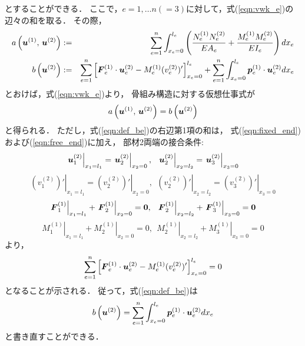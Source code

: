 \documentclass[10pt,a4j]{jarticle}
\begin{document}
とすることができる．
ここで，$e=1,\dots n(=3)$に対して，式(\ref{eqn:vwk_e})の辺々の和を取る．
その際，
\begin{eqnarray}
	a\left(
		\fat{u}^{(1)}
		,\,  
		\fat{u}^{(2)}
	\right) 
	&:=& 
	\sum_{e=1}^n 
	\int_{x_e=0}^{l_e} 
	\left(
	\frac{N_e^{(1)}N_e^{(2)}}{EA_e}
	+
	\frac{M_e^{(1)}M_e^{(2)}}{EI_e}
	\right)
	dx_e
	\label{eqn:def_ae}
	\\
%
	b\left( 
		 \fat{u}^{(2)}
	\right)
	&:=&
	\sum_{e=1}^n
	\left[ 
		\fat{F}_e^{(1)}\cdot \fat{u}_e^{(2)}
		-
		M_e^{(1)}
		(v_e^{(2)})'
	\right]_{x_e=0}^{l_e}
	+
	\sum_{e=1}^n 
	\int_{x_e=0}^{l_e} 
	\fat{p}_e^{(1)} \cdot \fat{u}_e^{(2)}dx_e
	\label{eqn:def_be}
\end{eqnarray}
とおけば，式(\ref{eqn:vwk_e})より，
骨組み構造に対する仮想仕事式が
\begin{equation}
	a\left(
		 \mbox{\boldmath $u$}^{(1)}
		,\,  
		\mbox{\boldmath $u$}^{(2)}
	\right) 
	=
	b\left( 
		\mbox{\boldmath $u$}^{(2)}
	\right)
	\label{eqn:VW_frame}
\end{equation}
と得られる．
ただし，式(\ref{eqn:def_be})の右辺第1項の和は，
式(\ref{eqn:fixed_end})および(\ref{eqn:free_end})に加え，
部材2両端の接合条件:
\begin{equation}
	\left. \fat{u}_1^{(2)} \right|_{x_1=l_1}
	=
	\left. \fat{u}_2^{(2)} \right|_{x_2=0}, \ \ 
	\left. \fat{u}_2^{(2)} \right|_{x_2=l_2}
	=
	\left. \fat{u}_3^{(2)} \right|_{x_3=0}
	\label{eqn:}
\end{equation}
\begin{equation}
	\left. (v_1^{(2)})' \right|_{x_1=l_1}
	=
	\left. (v_2^{(2)})' \right|_{x_2=0}, \ \ 
	\left. (v_2^{(2)})' \right|_{x_2=l_2}
	=
	\left. (v_3^{(2)})' \right|_{x_3=0}
	\label{eqn:}
\end{equation}
\begin{equation}
	\left. \fat{F}_1^{(1)} \right|_{x_1=l_1}
	+
	\left. \fat{F}_2^{(1)} \right|_{x_2=0}
	=\fat{0}	
	, \ \ 
	\left. \fat{F}_2^{(1)} \right|_{x_2=l_2}
	+
	\left. \fat{F}_3^{(1)} \right|_{x_3=0}
	=\fat{0}	
	\label{eqn:}
\end{equation}
\begin{equation}
	\left. M_1^{(1)} \right|_{x_1=l_1}
	+
	\left. M_2^{(1)} \right|_{x_2=0}=0
	, \ \ 
	\left. M_2^{(1)} \right|_{x_2=l_2}
	+
	\left. M_3^{(1)} \right|_{x_3=0}=0
	\label{eqn:}
\end{equation}
より，
\begin{equation}
	\sum_{e=1}^n
	\left[ 
		\mbox{\boldmath $F$}_e^{(1)}\cdot \mbox{\boldmath $u$}_e^{(2)}
		-
		M_e^{(1)}
		(v_e^{(2)})'
	\right]_{x_e=0}^{l_e}
	=0
\end{equation}
となることが示される．
従って，式(\ref{eqn:def_be})は
\begin{equation}
	b\left( 
		 \mbox{\boldmath $u$}^{(2)}
	\right)
	=
	\sum_{e=1}^n 
	\int_{x_e=0}^{l_e} 
	\mbox{\boldmath $p$}_e^{(1)} \cdot \mbox{\boldmath $u$}_e^{(2)}dx_e
	\label{eqn:def_be2}
\end{equation}
と書き直すことができる．
\end{document}
